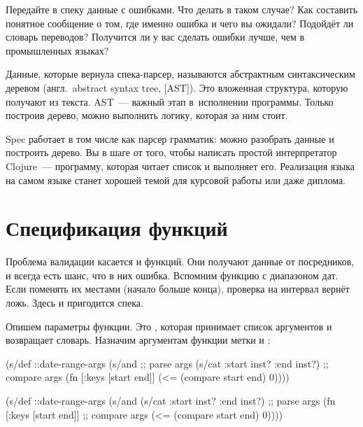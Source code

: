 Передайте в спеку данные с ошибками. Что делать в таком случае? Как составить
понятное сообщение о том, где именно ошибка и чего вы ожидали? Подойдёт ли
словарь переводов? Получится ли у вас сделать ошибки лучше, чем в промышленных
языках?

Данные, которые вернула спека-парсер, называются абстрактным синтаксическим деревом
(англ.~abstract syntax tree, [AST]).
Это вложенная структура, которую получают из текста. AST~--- важный этап в~исполнении
программы. Только построив дерево, можно выполнить логику, которая за ним стоит.


Spec работает в том числе как парсер грамматик: можно разобрать данные и
построить дерево. Вы в шаге от того, чтобы написать простой интерпретатор
Clojure~--- программу, которая читает список и выполняет его. Реализация языка
на самом языке станет хорошей темой для курсовой работы или даже диплома.

\section{Спецификация функций}


Проблема валидации касается и функций. Они получают данные от посредников, и
всегда есть шанс, что в них ошибка. Вспомним функцию с диапазоном дат. Если
поменять их местами (начало больше конца), проверка на интервал вернёт
ложь. Здесь и пригодится спека.

Опишем параметры функции. Это , которая принимает список аргументов
и возвращает словарь. Назначим аргументам функции метки  и
:

\pagebreakafive

\ifnarrow


\begin{clojure}
(s/def ::date-range-args
  (s/and
    ;; parse args
    (s/cat :start inst? :end inst?)
    ;; compare args
    (fn [{:keys [start end]}]
      (<= (compare start end) 0))))
\end{clojure}


\else


\begin{clojure}
(s/def ::date-range-args
  (s/and
   (s/cat :start inst? :end inst?) ;; parse args
   (fn [{:keys [start end]}]       ;; compare args
     (<= (compare start end) 0))))
\end{clojure}


